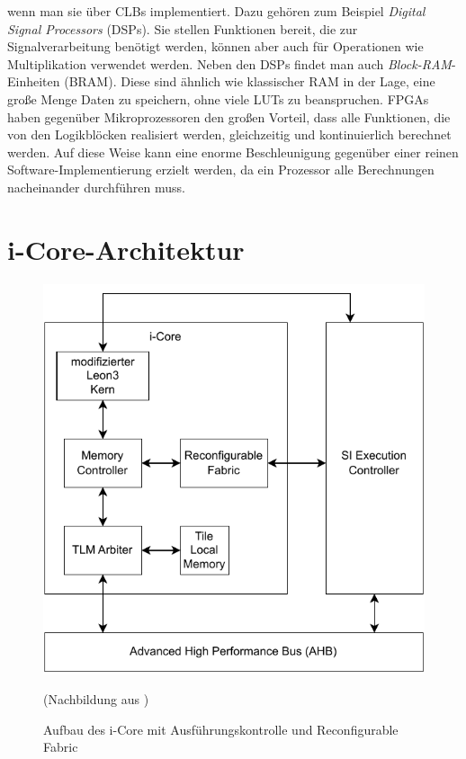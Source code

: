 wenn man sie über CLBs implementiert. Dazu gehören zum Beispiel \textit{Digital Signal Processors} (DSPs).
Sie stellen Funktionen bereit, die zur Signalverarbeitung benötigt werden, können aber auch für Operationen wie Multiplikation verwendet werden.
Neben den DSPs findet man auch \textit{Block-RAM}-Einheiten (BRAM). Diese sind ähnlich wie klassischer RAM in der Lage, eine große Menge Daten zu speichern,
ohne viele LUTs zu beanspruchen. FPGAs haben gegenüber Mikroprozessoren den großen Vorteil, dass alle Funktionen, die von den Logikblöcken
realisiert werden, gleichzeitig und kontinuierlich berechnet werden. Auf diese Weise kann eine enorme Beschleunigung gegenüber einer
reinen Software-Implementierung erzielt werden, da ein Prozessor alle Berechnungen nacheinander durchführen muss.

\section{i-Core-Architektur}
\begin{figure}
    \center
    \includegraphics{images/Icore_Arch.pdf}
    \caption{Aufbau des i-Core mit Ausführungskontrolle und Reconfigurable Fabric}
	(Nachbildung aus \cite{hering2020})
    \label{fig:icore_arch}
\end{figure}
\label{sec:icore_arch}
